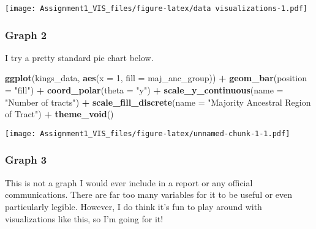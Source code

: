 \documentclass[
]{article}
\newenvironment{Shaded}{\begin{snugshade}}{\end{snugshade}}
\newcommand{\DataTypeTok}[1]{\textcolor[rgb]{0.13,0.29,0.53}{#1}}
\newcommand{\DecValTok}[1]{\textcolor[rgb]{0.00,0.00,0.81}{#1}}
\newcommand{\KeywordTok}[1]{\textcolor[rgb]{0.13,0.29,0.53}{\textbf{#1}}}
\newcommand{\NormalTok}[1]{#1}
\newcommand{\OperatorTok}[1]{\textcolor[rgb]{0.81,0.36,0.00}{\textbf{#1}}}
\newcommand{\StringTok}[1]{\textcolor[rgb]{0.31,0.60,0.02}{#1}}
\begin{document}
\texttt{[image: Assignment1\_VIS\_files/figure-latex/data visualizations-1.pdf]}

\hypertarget{graph-2}{%
\subsubsection{Graph 2}\label{graph-2}}

I try a pretty standard pie chart below.

\begin{Shaded}
\begin{Highlighting}[]
\KeywordTok{ggplot}\NormalTok{(kings_data,}
       \KeywordTok{aes}\NormalTok{(}\DataTypeTok{x =} \DecValTok{1}\NormalTok{, }\DataTypeTok{fill =}\NormalTok{ maj_anc_group)) }\OperatorTok{+}
\StringTok{  }\KeywordTok{geom_bar}\NormalTok{(}\DataTypeTok{position =} \StringTok{"fill"}\NormalTok{) }\OperatorTok{+}
\StringTok{  }\KeywordTok{coord_polar}\NormalTok{(}\DataTypeTok{theta =} \StringTok{"y"}\NormalTok{) }\OperatorTok{+}
\StringTok{  }\KeywordTok{scale_y_continuous}\NormalTok{(}\DataTypeTok{name =} \StringTok{"Number of tracts"}\NormalTok{) }\OperatorTok{+}
\StringTok{  }\KeywordTok{scale_fill_discrete}\NormalTok{(}\DataTypeTok{name =} \StringTok{"Majority Ancestral Region of Tract"}\NormalTok{) }\OperatorTok{+}
\StringTok{  }\KeywordTok{theme_void}\NormalTok{() }
\end{Highlighting}
\end{Shaded}

\texttt{[image: Assignment1\_VIS\_files/figure-latex/unnamed-chunk-1-1.pdf]}

\hypertarget{graph-3}{%
\subsubsection{Graph 3}\label{graph-3}}

This is not a graph I would ever include in a report or any official
communications. There are far too many variables for it to be useful or
even particularly legible. However, I do think it's fun to play around
with visualizations like this, so I'm going for it!
\end{document}
